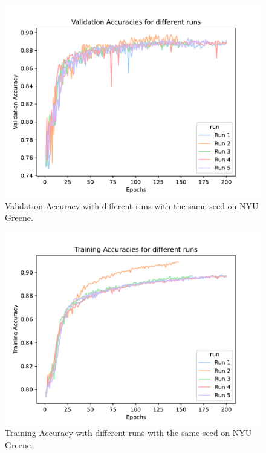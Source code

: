 \documentclass[sigplan,screen]{acmart}
\begin{document}
\begin{figure}[htb]
\centering\includegraphics[width=1.0\columnwidth]{images/validation_accuracy_diff_runs.pdf}
\caption{Validation Accuracy with different runs with the same seed on NYU Greene.}
\label{fig:Validation Accuracy}
\end{figure}

\begin{figure}[htb]
\centering\includegraphics[width=1.0\columnwidth]{images/training_accuracy_diff_runs.pdf}
\caption{Training Accuracy with different runs with the same seed on NYU Greene.}
\label{fig:Training Accuracy}
\end{figure}
\end{document}
